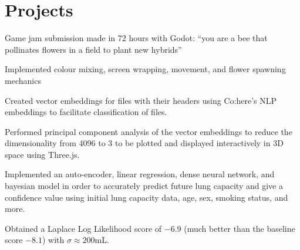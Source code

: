 \section{Projects}

\begin{resumeItem}
\begin{resumeList}
    \item Game jam submission made in 72 hours with Godot: ``you are a bee that pollinates flowers in a field to plant new hybrids''
    \item Implemented colour mixing, screen wrapping, movement, and flower spawning mechanics
\end{resumeList}
\end{resumeItem}

\begin{resumeItem}
\begin{resumeList}
    \item Created vector embeddings for files with their headers using Co:here's NLP embeddings to facilitate classification of files.
    \item Performed principal component analysis of the vector embeddings to reduce the dimensionality from 4096 to 3 to be plotted and displayed interactively in 3D space using Three.js.
\end{resumeList}
\end{resumeItem}

\begin{resumeItem}
\begin{resumeList}
    \item Implemented an auto-encoder, linear regression, dense neural network, and bayesian model in order to accurately predict future lung capacity and give a confidence value using initial lung capacity data, age, sex, smoking status, and more.
    \item Obtained a Laplace Log Likelihood score of $-6.9$ (much better than the baseline score $-8.1$) with $\sigma \approx 200$mL.
\end{resumeList}
\end{resumeItem}

